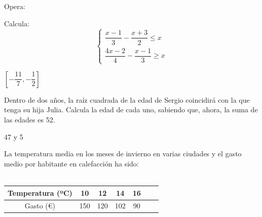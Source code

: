 \documentclass[addpoints,spanish, 12pt,a4paper]{exam}
\begin{document}
\begin{questions}

\question[2] Opera:


\question[2] Calcula: $$ \left\{\begin{matrix}\dfrac{{x - 1}}{3} - \dfrac{{x + 3}}{2} \leq x\\ \dfrac{{4x - 2}}{4} - \dfrac{{x - 1}}{3} \geq x\end{matrix}\right.$$ \begin{solution}   $\left[- \dfrac{11}{7}, - \dfrac{1}{2}\right]$ \end{solution}

\question[2] Dentro de dos años, la raíz cuadrada de la edad de Sergio coincidirá con la que tenga su hija Julia. Calcula la edad de cada uno, sabiendo que, ahora, la suma de las edades es 52.
\begin{solution}   47 y 5 \end{solution}

\question La temperatura media en los meses de invierno en varias ciudades y el gasto medio por habitante en
calefacción ha sido:\\
\\
\begin{tabular}{|c||c|c|c|c|c|c|}
\hline 
Temperatura (ºC) & 10 & 12 & 14 & 16  \\ 
\hline 
Gasto (\euro ) & 150 & 120 & 102 & 90  \\ 
\hline 
\end{tabular} \\
\begin{parts}

\end{parts}
\end{questions}
\end{document}

